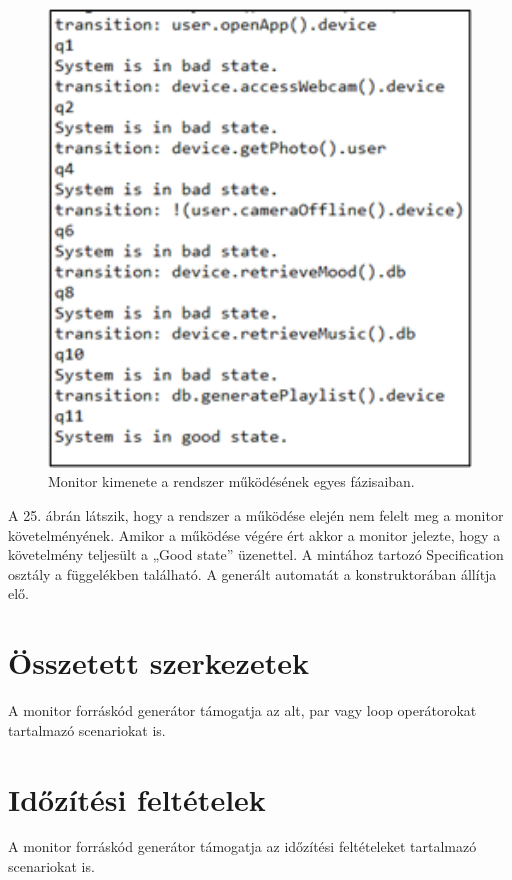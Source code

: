 \begin{figure}[!ht]
    \centering
    \includegraphics[width=150mm, keepaspectratio]{figures/23abra.png}
    \caption{Monitor kimenete a rendszer működésének egyes fázisaiban.}
\end{figure}
A 25. ábrán látszik, hogy a rendszer a működése elején nem felelt meg a monitor követelményének. Amikor a működése végére ért akkor a monitor jelezte, hogy a követelmény teljesült a „Good state” üzenettel. A mintához tartozó Specification osztály a függelékben található. A generált automatát a konstruktorában állítja elő.

\section{Összetett szerkezetek}

A monitor forráskód generátor támogatja az alt, par vagy loop operátorokat tartalmazó scenariokat is.

\section{Időzítési feltételek}

A monitor forráskód generátor támogatja az időzítési feltételeket tartalmazó scenariokat is.